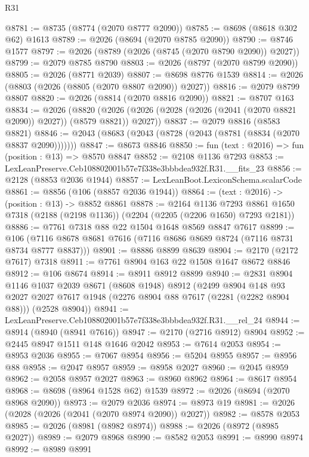 \begin{lexlean}{R31}
\begin{coremodule}
@8781 := @8735 (@8774 (@2070 @8777 @2090))
@8785 := @8698 (@8618 @302 @62) @1613
@8789 := @2026 (@8694 (@2070 @8785 @2090))
@8790 := @8746 @1577
@8797 := @2026 (@8789 (@2026 (@8745 (@2070 @8790 @2090)) @2027))
@8799 := @2079 @8785 @8790
@8803 := @2026 (@8797 (@2070 @8799 @2090))
@8805 := @2026 (@8771 @2039)
@8807 := @8698 @8776 @1539
@8814 := @2026 (@8803 (@2026 (@8805 (@2070 @8807 @2090)) @2027))
@8816 := @2079 @8799 @8807
@8820 := @2026 (@8814 (@2070 @8816 @2090))
@8821 := @8707 @163
@8834 := @2026
    (@8820 (@2026 (@2026 (@2028 (@2026 (@2041 (@2070 @8821 @2090)) @2027)) (@8579 @8821)) @2027))
@8837 := @2079 @8816 (@8583 @8821)
@8846 := @2043 (@8683 (@2043 (@8728 (@2043 (@8781 (@8834 (@2070 @8837 @2090)))))))
@8847 := @8673 @8846
@8850 := fun (text : @2016) => fun (position : @13) => @8570 @8847
@8852 := @2108 @1136 @7293
@8853 := LexLeanPreserve.Ceb108802001b57e7f338e3bbbdea932f.R31.__fits_23
@8856 := @2128 (@8853 @2036 @1944)
@8857 := LexLeanBoot.LexiconSchema.scalarCode
@8861 := @8856 (@106 (@8857 @2036 @1944))
@8864 := (text : @2016) -> (position : @13) -> @8852 @8861
@8878 := @2164
    @1136
    @7293
    @8861
    @1650
    @7318
    (@2188 (@2198 @1136))
    (@2204 (@2205 (@2206 @1650) @7293 @2181))
@8886 := @7761 @7318 @88 @22 @1504 @1648 @8569 @8847 @7617
@8899 := @106 (@7116 @8678 @8681 @7616 (@7116 @8686 @8689 @8724 (@7116 @8731 @8734 @8777 @8837)))
@8901 := @8886 @8899 @8639
@8904 := @2170 (@2172 @7617) @7318
@8911 := @7761 @8904 @163 @22 @1508 @1647 @8672 @8846
@8912 := @106 @8674
@8914 := @8911 @8912 @8899
@8940 := @2831
    @8904
    @1146
    @1037
    @2039
    @8671
    (@8608 @1948)
    @8912
    (@2499
      @8904
      @148
      @93
      @2027
      @2027
      @7617
      @1948
      (@2276 @8904 @88 @7617 (@2281 (@2282 @8904 @88)))
      (@2528 @8904))
@8941 := LexLeanPreserve.Ceb108802001b57e7f338e3bbbdea932f.R31.__rel_24
@8944 := @8914 (@8940 (@8941 @7616))
@8947 := @2170 (@2716 @8912) @8904
@8952 := @2445 @8947 @1511 @148 @1646 @2042
@8953 := @7614 @2053
@8954 := @8953 @2036
@8955 := @7067 @8954
@8956 := @5204 @8955
@8957 := @8956 @88
@8958 := @2047 @8957
@8959 := @8958 @2027
@8960 := @2045 @8959
@8962 := @2058 @8957 @2027
@8963 := @8960 @8962
@8964 := @8617 @8954
@8968 := @8698 (@8964 @1528 @62) @1539
@8972 := @2026 (@8694 (@2070 @8968 @2090))
@8973 := @2079 @2036
@8974 := @8973 @19
@8981 := @2026 (@2028 (@2026 (@2041 (@2070 @8974 @2090)) @2027))
@8982 := @8578 @2053
@8985 := @2026 (@8981 (@8982 @8974))
@8988 := @2026 (@8972 (@8985 @2027))
@8989 := @2079 @8968
@8990 := @8582 @2053
@8991 := @8990 @8974
@8992 := @8989 @8991

\end{coremodule}
\end{lexlean}
